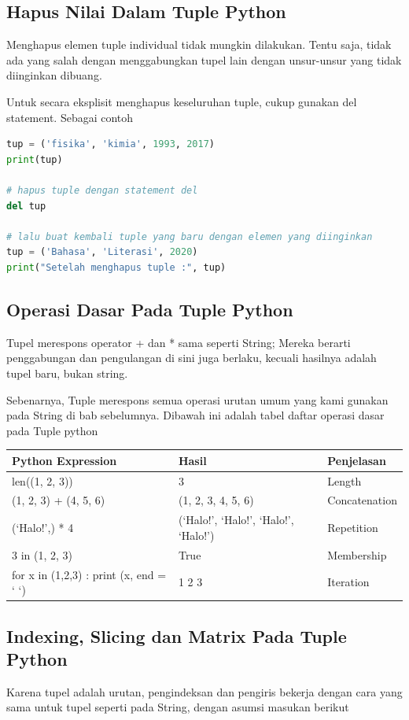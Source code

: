 \subsection{Hapus Nilai Dalam Tuple Python}
Menghapus elemen tuple individual tidak mungkin dilakukan. Tentu saja, tidak ada yang salah dengan menggabungkan tupel lain dengan unsur-unsur yang tidak diinginkan dibuang.

Untuk secara eksplisit menghapus keseluruhan tuple, cukup gunakan del statement. Sebagai contoh
\begin{lstlisting}[language=Python]
tup = ('fisika', 'kimia', 1993, 2017)
print(tup)

# hapus tuple dengan statement del
del tup

# lalu buat kembali tuple yang baru dengan elemen yang diinginkan
tup = ('Bahasa', 'Literasi', 2020)
print("Setelah menghapus tuple :", tup)
\end{lstlisting}

\subsection{Operasi Dasar Pada Tuple Python}
Tupel merespons operator + dan * sama seperti String; Mereka berarti penggabungan dan pengulangan di sini juga berlaku, kecuali hasilnya adalah tupel baru, bukan string.

Sebenarnya, Tuple merespons semua operasi urutan umum yang kami gunakan pada String di bab sebelumnya. Dibawah ini adalah tabel daftar operasi dasar pada Tuple python
\begin{center}
\begin{tabular}{ | m{4cm} | m{4cm} | m{2cm} | }
\hline
Python Expression & Hasil & Penjelasan \\
\hline
len((1, 2, 3)) & 3 & Length \\
\hline
(1, 2, 3) + (4, 5, 6) & (1, 2, 3, 4, 5, 6) & Concatenation \\
\hline
(‘Halo!’,) * 4 & (‘Halo!’, ‘Halo!’, ‘Halo!’, ‘Halo!’) & Repetition \\
\hline
3 in (1, 2, 3) & True & Membership \\
\hline
for x in (1,2,3) : print (x, end = ‘ ‘) & 1 2 3 & Iteration \\
\hline
\end{tabular}
\end{center}

\subsection{Indexing, Slicing dan Matrix Pada Tuple Python}
Karena tupel adalah urutan, pengindeksan dan pengiris bekerja dengan cara yang sama untuk tupel seperti pada String, dengan asumsi masukan berikut

